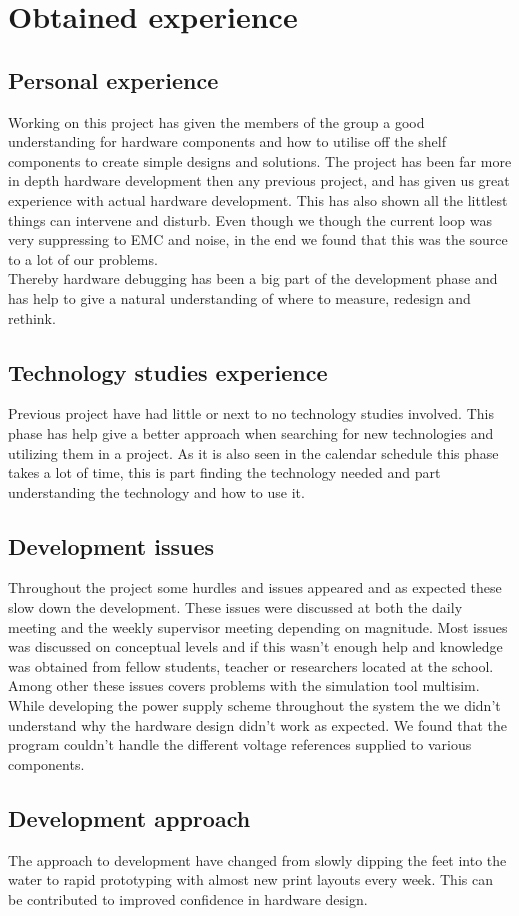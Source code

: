 \chapter{Obtained experience}

\section{Personal experience}
Working on this project has given the members of the group a good understanding for hardware components and how to utilise off the shelf components to create simple designs and solutions. The project has been far more in depth hardware development then any previous project, and has given us great experience with actual hardware development. This has also shown all the littlest things can intervene and disturb. Even though we though the current loop was very suppressing to EMC and noise, in the end we found that this was the source to a lot of our problems.\\
Thereby hardware debugging has been a big part of the development phase and has help to give a natural understanding of where to measure, redesign and rethink.

\section{Technology studies experience}
Previous project have had little or next to no technology studies involved. This phase has help give a better approach when searching for new technologies and utilizing them in a project. As it is also seen in the calendar schedule this phase takes a lot of time, this is part finding the technology needed and part understanding the technology and how to use it. 

\section{Development issues}
Throughout the project some hurdles and issues appeared and as expected these slow down the development. These issues were discussed at both the daily meeting and the weekly supervisor meeting depending on magnitude. Most issues was discussed on conceptual levels and if this wasn't enough help and knowledge was obtained from fellow students, teacher or researchers located at the school.\\
Among other these issues covers problems with the simulation tool multisim. While developing the power supply scheme throughout the system the we didn't understand why the hardware design didn't work as expected. We found that the program couldn't handle the different voltage references supplied to various components.

\section{Development approach}
The approach to development have changed from slowly dipping the feet into the water to rapid prototyping with almost new print layouts every week. This can be contributed to improved confidence in hardware design.